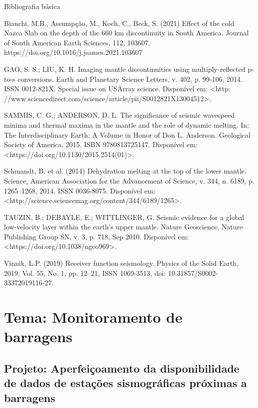 \documentclass[10pt,a4paper,oneside]{book}
\begin{document}
\begin{fancyenum}{\faBook}{Bibliografia básica}
	\item Bianchi, M.B., Assumpção, M., Koch, C., Beck, S. (2021) Effect of the cold Nazca Slab on the depth of the 660 km discontinuity in South America. Journal of South American Earth Sciences, 112, 103607. https://doi.org/10.1016/j.jsames.2021.103607
	\item GAO, S. S.; LIU, K. H. Imaging mantle discontinuities using multiply-reflected p-to-s conversions. Earth and Planetary Science Letters, v. 402, p. 99-106,
2014. ISSN 0012-821X. Special issue on USArray science. Disponível em: <http: //www.sciencedirect.com/science/article/pii/S0012821X13004512>.
	\item SAMMIS, C. G.; ANDERSON, D. L. The significance of seismic wavespeed minima and thermal maxima in the mantle and the role of dynamic melting. In: The Interdisciplinary Earth: A Volume in Honor of Don L. Anderson. Geological Society of America, 2015. ISBN 9780813725147. Disponível em: <https://doi.org/10.1130/2015.2514(01)>.
	\item Schmandt, B. et al. (2014) Dehydration melting at the top of the lower mantle. Science, American Association for the Advancement of Science, v. 344, n. 6189, p. 1265–1268, 2014. ISSN 0036-8075. Disponível em: <http://science.sciencemag.org/content/344/6189/1265>.
	\item TAUZIN, B.; DEBAYLE, E.; WITTLINGER, G. Seismic evidence for a global low-velocity layer within the earth’s upper mantle. Nature Geoscience, Nature Publishing Group SN,
v. 3, p. 718, Sep 2010. Disponível em: <https://doi.org/10.1038/ngeo969>.
	\item Vinnik, L.P. (2019) Receiver function seismology. Physics of the Solid Earth, 2019, Vol. 55, No. 1, pp. 12–21, ISSN 1069-3513, doi: 10.31857/S0002-33372019116-27.
\end{fancyenum}


\section{Tema: Monitoramento de barragens}

\subsection{Projeto: Aperfeiçoamento da disponibilidade de dados de estações sismográficas próximas a barragens}
\end{document}

